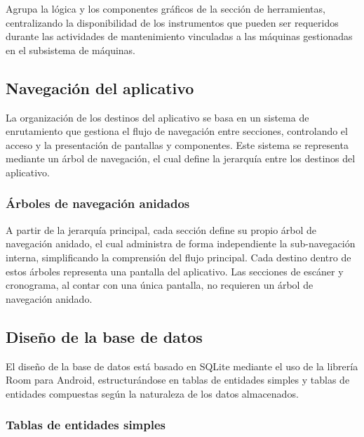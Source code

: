             Agrupa la lógica y los componentes gráficos de la sección de herramientas, centralizando la disponibilidad de los instrumentos que pueden ser requeridos durante las actividades de mantenimiento vinculadas a las máquinas gestionadas en el subsistema de máquinas.

    \subsection{Navegación del aplicativo}

        La organización de los destinos del aplicativo se basa en un sistema de enrutamiento que gestiona el flujo de navegación entre secciones, controlando el acceso y la presentación de pantallas y componentes. Este sistema se representa mediante un árbol de navegación, el cual define la jerarquía entre los destinos del aplicativo.


        \subsubsection{Árboles de navegación anidados}

            A partir de la jerarquía principal, cada sección define su propio árbol de navegación anidado, el cual administra de forma independiente la sub-navegación interna, simplificando la comprensión del flujo principal. Cada destino dentro de estos árboles representa una pantalla del aplicativo. Las secciones de escáner y cronograma, al contar con una única pantalla, no requieren un árbol de navegación anidado.


    \subsection{Diseño de la base de datos}

        El diseño de la base de datos está basado en SQLite mediante el uso de la librería Room para Android, estructurándose en tablas de entidades simples y tablas de entidades compuestas según la naturaleza de los datos almacenados.

        \subsubsection{Tablas de entidades simples}


